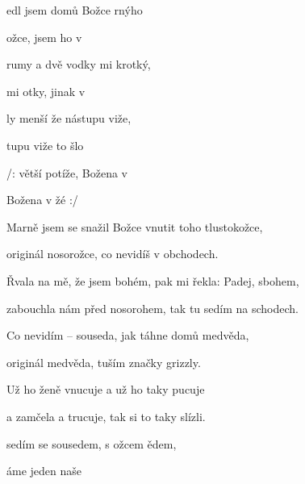 

\zs
{}edl jsem domů Božce rnýho 

 ožce,  jsem ho v 

 rumy a dvě vodky  mi  krotký,

 mi otky,  jinak v 

ly menší že  nástupu viže,

tupu viže  to šlo 

/:  větší potíže,  Božena v 

 Božena v žé   :/
\ks

\zs
Marně jsem se snažil Božce vnutit toho tlustokožce,

originál nosorožce, co nevidíš v obchodech.

Řvala na mě, že jsem bohém, pak mi řekla: Padej, sbohem,

zabouchla nám před nosorohem, tak tu sedím na schodech.

Co nevidím -- souseda, jak táhne domů medvěda,

originál medvěda, tuším značky grizzly.

Už ho ženě vnucuje a už ho taky pucuje

a zamčela a trucuje, tak si to taky slízli.
\ks

\zs
{} sedím se sousedem, s ožcem ědem,

áme  jeden  naše 
\ks

\kp


